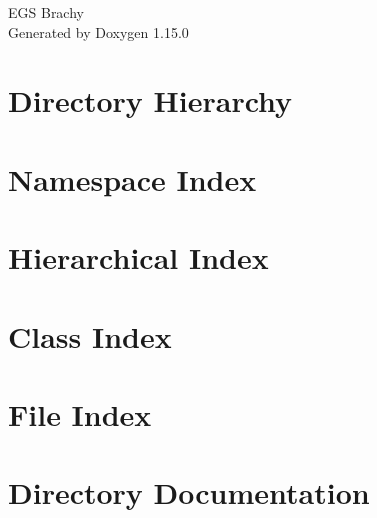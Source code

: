 \documentclass[twoside]{book}
\newcommand{\+}{\discretionary{\mbox{\scriptsize$\hookleftarrow$}}{}{}}
\newcommand{\clearemptydoublepage}{%
    \newpage{\pagestyle{empty}\cleardoublepage}%
  }
\begin{document}
  \raggedbottom
  \begin{titlepage}
  \vspace*{7cm}
  \begin{center}%
  {\Large EGS Brachy}\\
  \vspace*{1cm}
  {\large Generated by Doxygen 1.15.0}\\
  \end{center}
  \end{titlepage}
  \clearemptydoublepage
  \tableofcontents
  \clearemptydoublepage






\chapter{Directory Hierarchy}

\chapter{Namespace Index}

\chapter{Hierarchical Index}

\chapter{Class Index}

\chapter{File Index}

\chapter{Directory Documentation}






























\end{document}
